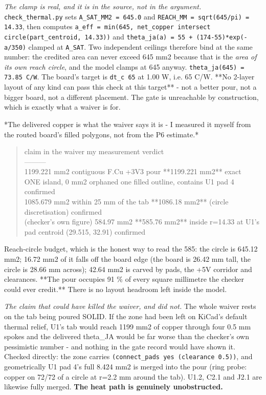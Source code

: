 \documentclass[11pt,a4paper]{article}
\begin{document}
\emph{The clamp is real, and it is in the source, not in the argument.} \texttt{check\_thermal.py} sets \texttt{A\_SAT\_MM2 = 645.0} and \texttt{REACH\_MM = sqrt(645/pi) = 14.33}, then computes \texttt{a\_eff = min(645, net\_copper  intersect  circle(part\_centroid, 14.33))} and \texttt{theta\_ja(a) = 55 + (174-55){*}exp(-a/350)} clamped at \texttt{A\_SAT}. Two independent ceilings therefore bind at the same number: the credited area can never exceed 645 mm2 because that is the \emph{area of its own reach circle}, and the model clamps at 645 anyway. \texttt{theta\_ja(645) = 73.85 C/W}. The board's target is \texttt{dt\_c 65} at 1.00 W, i.e. 65 C/W. {*}{*}No 2-layer layout of any kind can pass this check at this target{*}{*} - not a better pour, not a bigger board, not a different placement. The gate is unreachable by construction, which is exactly what a waiver is for.

{*}The delivered copper is what the waiver says it is - I measured it myself from the routed board's filled polygons, not from the P6 estimate.{*}

\begin{quote}\small\ttfamily\raggedright
\textbar{} claim in the waiver \textbar{} my measurement \textbar{} verdict \textbar{}\\
\textbar{}---\textbar{}---\textbar{}---\textbar{}\\
\textbar{} 1199.221 mm2 contiguous F.Cu +3V3 pour \textbar{} {*}{*}1199.221 mm2{*}{*} \textbar{} exact \textbar{}\\
\textbar{} ONE island, 0 mm2 orphaned \textbar{} one filled outline, contains U1 pad 4 \textbar{} confirmed \textbar{}\\
\textbar{} 1085.679 mm2 within 25 mm of the tab \textbar{} {*}{*}1086.18 mm2{*}{*} (circle discretisation) \textbar{} confirmed \textbar{}\\
\textbar{} (checker's own figure) 584.97 mm2 \textbar{} {*}{*}585.76 mm2{*}{*} inside r=14.33 at U1's pad centroid (29.515, 32.91) \textbar{} confirmed \textbar{}
\end{quote}
Reach-circle budget, which is the honest way to read the 585: the circle is 645.12 mm2; 16.72 mm2 of it falls off the board edge (the board is 26.42 mm tall, the circle is 28.66 mm across); 42.64 mm2 is carved by pads, the +5V corridor and clearances. {*}{*}The pour occupies 91 \% of every square millimetre the checker could ever credit.{*}{*} There is no layout headroom left inside the model.

\emph{The claim that could have killed the waiver, and did not.} The whole waiver rests on the tab being poured SOLID. If the zone had been left on KiCad's default thermal relief, U1's tab would reach 1199 mm2 of copper through four 0.5 mm spokes and the delivered theta\_JA would be far worse than the checker's own pessimistic number - and nothing in the gate record would have shown it. Checked directly: the zone carries \texttt{(connect\_pads yes (clearance 0.5))}, and geometrically U1 pad 4's full 8.424 mm2 is merged into the pour (ring probe: copper on 72/72 of a circle at r=2.2 mm around the tab). U1.2, C2.1 and J2.1 are likewise fully merged. \textbf{The heat path is genuinely unobstructed.}
\end{document}
